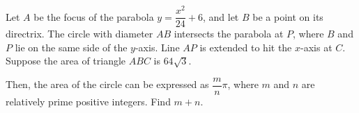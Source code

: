 Let $A$ be the focus of the parabola $y = \dfrac{x^2}{24} + 6$, and let $B$ be a point on its directrix. The circle with diameter $AB$ intersects the parabola at $P$, where $B$ and $P$ lie on the same side of the $y$-axis. Line $AP$ is extended to hit the $x$-axis at $C$. Suppose the area of triangle $ABC$ is $64\sqrt{3}$.



Then, the area of the circle can be expressed as $\dfrac{m}{n}\pi$, where $m$ and $n$ are relatively prime positive integers. Find $m + n$.
